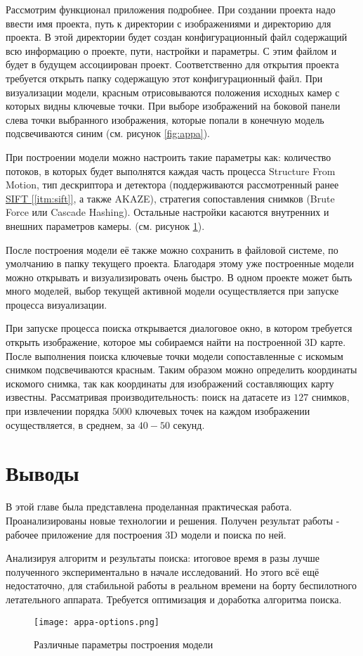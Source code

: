 Рассмотрим функционал приложения подробнее. При создании проекта надо ввести имя проекта, путь к директории с изображениями и директорию для проекта. В этой директории будет создан конфигурационный файл содержащий всю информацию о проекте, пути, настройки и параметры. С этим файлом и будет в будущем ассоциирован проект. Соответственно для открытия проекта требуется открыть папку содержащую этот конфигурационный файл. При визуализации модели, красным отрисовываются положения исходных камер с которых видны ключевые точки. При выборе изображений на боковой панели слева точки выбранного изображения, которые попали в конечную модель подсвечиваются синим (см. рисунок \ref{fig:appa}).

При построении модели можно настроить такие параметры как: количество потоков, в которых будет выполнятся каждая часть процесса Structure From Motion, тип дескриптора и детектора (поддерживаются рассмотренный ранее \hyperref[itm:sift]{SIFT [\ref{itm:sift}]}, а также AKAZE), стратегия сопоставления снимков (Brute Force или Cascade Hashing). Остальные настройки касаются внутренних и внешних параметров камеры. (см. рисунок \ref{fig:appa-options}).

После построения модели её также можно сохранить в файловой системе, по умолчанию в папку текущего проекта. Благодаря этому уже построенные модели можно открывать и визуализировать очень быстро. В одном проекте может быть много моделей, выбор текущей активной модели осуществляется при запуске процесса визуализации.

При запуске процесса поиска открывается диалоговое окно, в котором требуется открыть изображение, которое мы собираемся найти на построенной 3D карте. После выполнения поиска ключевые точки модели сопоставленные с искомым снимком подсвечиваются красным. Таким образом можно определить координаты искомого снимка, так как координаты для изображений составляющих карту известны. Рассматривая производительность: поиск на датасете из $127$ снимков, при извлечении порядка $5000$ ключевых точек на каждом изображении осуществляется, в среднем, за $40-50$ секунд.

\section{Выводы}

В этой главе была представлена проделанная практическая работа. Проанализированы новые технологии и решения. Получен результат работы - рабочее приложение для построения 3D модели и поиска по ней.

Анализируя алгоритм и результаты поиска: итоговое время в разы лучше полученного экспериментально в начале исследований. Но этого всё ещё недостаточно, для стабильной работы в реальном времени на борту беспилотного летательного аппарата. Требуется оптимизация и доработка алгоритма поиска.

\begin{figure}[h]
    \centering
    \texttt{[image: appa-options.png]}
    \caption{Различные параметры построения модели}
    \label{fig:appa-options}
\end{figure}
